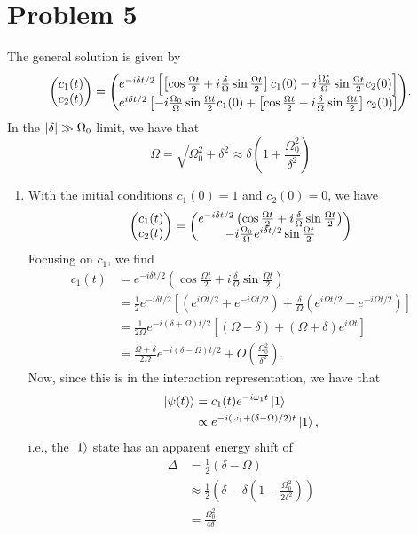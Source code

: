 \documentclass[12pt]{article}
\begin{document}
\section*{Problem 5}
The general solution is given by
\[ \mqty(c_1(t)\\c_2(t)) = \mqty(e^{-i\delta t/2}\left[\left[\cos\frac{\Omega t}{2} + i\frac{\delta}{\Omega}\sin\frac{\Omega t}{2}\right]c_1(0) - i\frac{\Omega_0^*}{\Omega}\sin\frac{\Omega t}{2}c_2(0)\right] \\ e^{i\delta t/2}\left[-i\frac{\Omega_0}{\Omega}\sin\frac{\Omega t}{2}c_1(0) + \left[\cos\frac{\Omega t}{2} - i\frac{\delta}{\Omega}\sin\frac{\Omega t}{2}\right]c_2(0)\right]). \]
In the $\abs{\delta} \gg \Omega_0$ limit, we have that
\[ \Omega = \sqrt{\Omega_0^2 + \delta^2} \approx \delta(1 + \frac{\Omega_0^2}{\delta^2}) \]
\begin{enumerate}[label=(\alph*)]
    \item With the initial conditions $c_1(0) = 1$ and $c_2(0) = 0$, we have 
    \[ \mqty(c_1(t)\\c_2(t)) = \mqty(e^{-i\delta t/2}\left(\cos\frac{\Omega t}{2} + i\frac{\delta}{\Omega}\sin\frac{\Omega t}{2}\right)\\ -i\frac{\Omega_0}{\Omega}e^{i\delta t/2}\sin\frac{\Omega t}{2}) \]
    Focusing on $c_1$, we find
    \begin{align*}
        c_1(t) &= e^{-i\delta t/2}\left(\cos\frac{\Omega t}{2} + i\frac{\delta}{\Omega}\sin\frac{\Omega t}{2}\right) \\
        &= \frac{1}{2}e^{-i\delta t/2}\left[\left(e^{i\Omega t/2} + e^{-i\Omega t/2}\right) + \frac{\delta}{\Omega}\left(e^{i\Omega t/2} - e^{-i\Omega t/2}\right)\right] \\
        &= \frac{1}{2\Omega}e^{-i(\delta+\Omega)t/2}\left[(\Omega - \delta) + (\Omega + \delta)e^{i\Omega t}\right] \\
        &= \frac{\Omega + \delta}{2\Omega}e^{-i(\delta-\Omega)t/2} + O(\frac{\Omega_0^2}{\delta^2}).
    \end{align*}
    Now, since this is in the interaction representation, we have that
    \begin{align*}
        \ket{\psi(t)} &= c_1(t)e^{-i\omega_1t}\ket{1} \\
        &\propto e^{-i(\omega_1 + (\delta-\Omega)/2)t}\ket{1},
    \end{align*}
    i.e., the $\ket{1}$ state has an apparent energy shift of
    \begin{align*}
        \Delta &= \frac{1}{2}(\delta - \Omega) \\
        &\approx \frac{1}{2}\left(\delta - \delta(1 - \frac{\Omega_0^2}{2\delta^2})\right) \\
        &= \frac{\Omega_0^2}{4\delta}
    \end{align*}


\end{enumerate}
\end{document}
